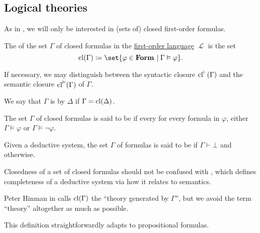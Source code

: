 \subsection{Logical theories}\label{subsec:logical_theories}

As in , we will only be interested in (sets of) closed first-order formulas.

\begin{definition}\label{def:first_order_theory}
  The  of the set \( \Gamma \) of closed formulas in the \hyperref[def:first_order_syntax]{first-order language} \( \mscrL \) is the set
  \begin{equation*}
    \cl(\Gamma) \coloneqq \set{ \varphi \in \boldop{Form} \given \Gamma \vDash \varphi }.
  \end{equation*}

  If necessary, we may distinguish between the syntactic closure \( \operatorname{cl}^\vdash(\Gamma) \) and the semantic closure \( \operatorname{cl}^\vDash(\Gamma) \) of \( \Gamma \).

  \begin{thmenum}
     We say that \( \Gamma \) is  by \( \Delta \) if \( \Gamma = \operatorname{cl}(\Delta) \).

    \medskip

     The set \( \Gamma \) of closed formulas is said to be  if every for every formula in \( \varphi \), either \( \Gamma \vDash \varphi \) or \( \Gamma \vDash \neg \varphi \).

     Given a deductive system, the set \( \Gamma \) of formulas is said to be  if \( \Gamma \vdash \bot \) and  otherwise.
  \end{thmenum}
\end{definition}
\begin{comments}
  \item Closedness of a set of closed formulas should not be confused with , which defines completeness of a deductive system via how it relates to semantics.

  \item Peter Hinman in \cite[def. 1.4.5]{Hinman2005} calls \( \operatorname{cl}(\Gamma) \) the \enquote{theory generated by \( \Gamma \)}, but we avoid the term \enquote{theory} altogether as much as possible.

  \item This definition straightforwardly adapts to propositional formulas.
\end{comments}

